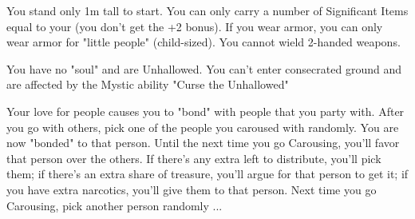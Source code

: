 {  You stand only 1m tall to start.  You can only carry a number of Significant Items equal to your \MAX \VIG (you don't get the +2 bonus). If you wear armor, you can only wear armor for "little people" (child-sized).  You cannot wield 2-handed weapons.

    
    You have no "soul" and are Unhallowed. You can't enter consecrated ground and are affected by the Mystic ability "Curse the Unhallowed"


    \cbreak


    Your love for people causes you to "bond" with people that you party with.  After you go  with others, pick one of the people you caroused with randomly. You are now "bonded" to that person.  Until the next time you go Carousing, you'll favor that person over the others. If there's any extra  left to distribute, you'll pick them; if there's an extra share of treasure, you'll argue for that person to get it; if you have extra narcotics, you'll give them to that person.  Next time you go Carousing, pick another person randomly ...



 


  \newpage





}

